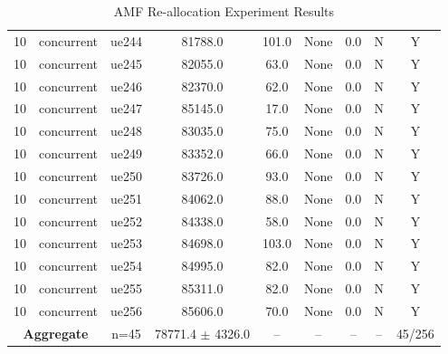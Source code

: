 \begin{table}[ht]
\begin{tabular}{|c|c|c|c|c|c|c|c|c|}
10 & concurrent & ue244 & 81788.0 & 101.0 & None & 0.0 & N & Y \\
10 & concurrent & ue245 & 82055.0 & 63.0 & None & 0.0 & N & Y \\
10 & concurrent & ue246 & 82370.0 & 62.0 & None & 0.0 & N & Y \\
10 & concurrent & ue247 & 85145.0 & 17.0 & None & 0.0 & N & Y \\
10 & concurrent & ue248 & 83035.0 & 75.0 & None & 0.0 & N & Y \\
10 & concurrent & ue249 & 83352.0 & 66.0 & None & 0.0 & N & Y \\
10 & concurrent & ue250 & 83726.0 & 93.0 & None & 0.0 & N & Y \\
10 & concurrent & ue251 & 84062.0 & 88.0 & None & 0.0 & N & Y \\
10 & concurrent & ue252 & 84338.0 & 58.0 & None & 0.0 & N & Y \\
10 & concurrent & ue253 & 84698.0 & 103.0 & None & 0.0 & N & Y \\
10 & concurrent & ue254 & 84995.0 & 82.0 & None & 0.0 & N & Y \\
10 & concurrent & ue255 & 85311.0 & 82.0 & None & 0.0 & N & Y \\
10 & concurrent & ue256 & 85606.0 & 70.0 & None & 0.0 & N & Y \\
\multicolumn{2}{|c|}{\textbf{Aggregate}} & n=45 & 78771.4 $\pm$ 4326.0 & -- & -- & -- & -- & 45/256 \\
\hline
\end{tabular}
\caption{AMF Re-allocation Experiment Results}
\label{tab:amf_realloc}
\end{table}
